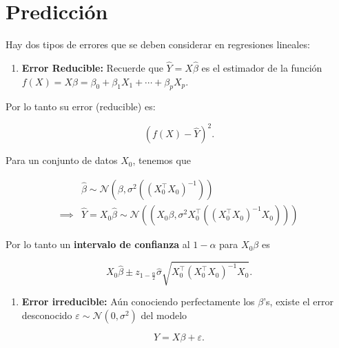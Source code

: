 \documentclass[
  12pt,
]{book}
\providecommand{\tightlist}{%
  \setlength{\itemsep}{0pt}\setlength{\parskip}{0pt}}
\begin{document}
\hypertarget{predicciuxf3n}{%
\section{Predicción}\label{predicciuxf3n}}

Hay dos tipos de errores que se deben considerar en regresiones
lineales:

\begin{enumerate}
\def\labelenumi{\arabic{enumi}.}
\tightlist
\item
  \textbf{Error Reducible:} Recuerde que \(\hat{Y} = X\hat{\beta}\) es
  el estimador de la función
  \(f(X)=X\beta = \beta_{0} + \beta_{1}X_{1}+\cdots+\beta_{p}X_{p}\).
\end{enumerate}

Por lo tanto su error (reducible) es:

\begin{equation*}
\left(  f(X) - \hat{Y}\right) ^{2}. 
\end{equation*}

Para un conjunto de datos \(X_{0}\), tenemos que

\begin{align*}
 & \hat{\beta} \sim  \mathcal{N}\left(\beta, \sigma^{2}\left( (X_{0}^{\top}X_{0})^{-1} \right)\right) \\
 \implies & \hat{Y} = X_{0}\hat{\beta} \sim \mathcal{N}\left((X_{0}\beta,\sigma^{2}X_{0}^{\top}((X_{0}^{\top}X_{0})^{-1}X_{0})) \right)
\end{align*}

Por lo tanto un \textbf{intervalo de confianza} al \(1-\alpha\) para
\(X_0\beta\) es

\begin{equation*}
X_{0}\hat \beta \pm z_{1-\frac{\alpha}{2}} \hat{\sigma} \sqrt{X_{0}^{\top}(X_{0}^{\top}X_{0})^{-1}X_{0}}.
\end{equation*}

\begin{enumerate}
\def\labelenumi{\arabic{enumi}.}
\setcounter{enumi}{1}
\tightlist
\item
  \textbf{Error irreducible:} Aún conociendo perfectamente los
  \(\beta\)'s, existe el error desconocido
  \(\varepsilon\sim \mathcal{N}\left(0,\sigma^{2}\right)\) del modelo
\end{enumerate}

\begin{equation*}
Y = X\beta + \varepsilon.
\end{equation*}
\end{document}
